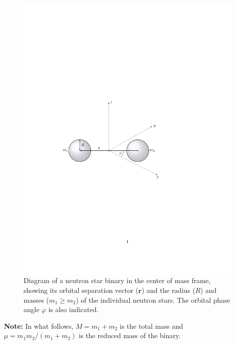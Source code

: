 \documentclass[11pt]{article}
\begin{document}
\begin{figure}[!h]
\begin{mdframed}
\centering
\includegraphics{intro/binary_diagram.pdf}
\caption{\label{fig:binary_diagram}Diagram of a neutron star binary in the center of mass frame, showing its orbital separation vector
($\mathbf{r}$) and the radius ($R$) and masses ($m_1 \geq m_2$) of the individual neutron stars. The orbital phase angle $\varphi$ is also
indicated.}
\end{mdframed}
\end{figure}

\vspace{1000pt}

\textbf{Note:} In what follows, $M = m_1 + m_2$ is the total mass and $\mu = m_1 m_2/(m_1 + m_2)$ is the reduced mass of the binary.
\end{document}
